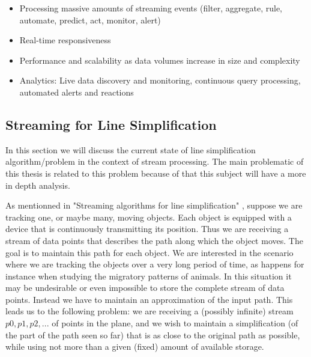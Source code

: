 \begin{itemize}
    \item  Processing massive amounts of streaming events (filter, aggregate, rule, automate, predict, act, monitor, alert)
    \item  Real-time responsiveness 
    \item  Performance and scalability as data volumes increase in size and complexity
    \item  Analytics: Live data discovery and monitoring, continuous query processing, automated alerts and reactions
\end{itemize}


\subsection{Streaming for Line Simplification}
In this section we will discuss the current state of line simplification algorithm/problem in the context of stream processing. The main problematic of this thesis is related to this problem because of that this subject will have a more in depth analysis.

As mentionned in "Streaming algorithms for line simplification" \cite{abam2007streaming}, suppose we are tracking one, or maybe many, moving objects. Each object is equipped with a device that is continuously transmitting its position. Thus we are receiving a stream of data points that describes the path along which the object moves. The goal is to maintain this path for each object. We are interested in the scenario where we are tracking the objects over a very long period of time, as happens for instance when studying the migratory patterns of animals. In this situation it may be undesirable or even impossible to store the complete stream of data points. Instead we have to maintain an approximation of the input path. This leads us to the following problem: we are receiving a (possibly infinite) stream $p0,p1,p2,...$ of points in the plane, and we wish to maintain a simplification (of the part of the path seen so far) that is as close to the original path as possible, while using not more than a given (fixed) amount of available storage.

